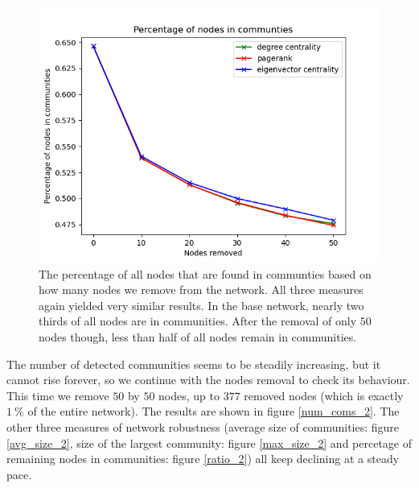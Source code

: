 \documentclass[9pt,twocolumn,twoside]{pnas-new}
\begin{document}
\begin{figure}[!htbp]
    \centering
    \includegraphics[width=0.9\linewidth]{ratio.png}
    \caption{The percentage of all nodes that are found in communties based on how many nodes we remove from the network.
    All three measures again yielded very similar results.
    In the base network, nearly two thirds of all nodes are in communities.
    After the removal of only $50$ nodes though, less than half of all nodes remain in communities.}
    \label{ratio}
\end{figure}

The number of detected communities seems to be steadily increasing, but it cannot rise forever, so we continue with the nodes removal to check its behaviour.
This time we remove $50$ by $50$ nodes, up to $377$ removed nodes (which is exactly $1~\%$ of the entire network). The results are shown in figure \ref{num_coms_2}.
The other three measures of network robustness 
(average size of communities: figure \ref{avg_size_2}, size of the largest community: figure \ref{max_size_2} and percetage of remaining nodes in communities: figure \ref{ratio_2})
all keep declining at a steady pace.
\end{document}
